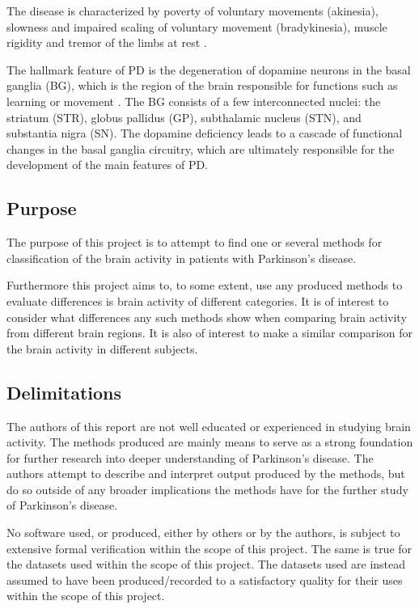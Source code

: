 \documentclass{article}
\begin{document}
The disease is characterized by poverty of voluntary movements (akinesia), slowness and impaired scaling of voluntary movement (bradykinesia), muscle rigidity and tremor of the limbs at rest \citep{DeMaags}.

The hallmark feature of PD is the degeneration of dopamine neurons in the basal ganglia (BG), which is the region of the brain responsible for functions such as learning or movement \citep{Hammond}. 
The BG consists of a few interconnected nuclei: the striatum (STR), globus pallidus (GP), subthalamic nucleus (STN), and substantia nigra (SN). 
The dopamine deficiency leads to a cascade of functional changes in the basal ganglia circuitry, which are ultimately responsible for the development of the main features of PD.

\subsection{Purpose}

The purpose of this project is to attempt to find one or several methods for classification of the brain activity in patients with Parkinson's disease.

Furthermore this project aims to, to some extent, use any produced methods to evaluate differences is brain activity of different categories.
It is of interest to consider what differences any such methods show when comparing brain activity from different brain regions.
It is also of interest to make a similar comparison for the brain activity in different subjects.

\subsection{Delimitations}

The authors of this report are not well educated or experienced in studying brain activity.
The methods produced are mainly means to serve as a strong foundation for further research into deeper understanding of Parkinson's disease.
The authors attempt to describe and interpret output produced by the methods, but do so outside of any broader implications the methods have for the further study of Parkinson's disease.

No software used, or produced, either by others or by the authors, is subject to extensive formal verification within the scope of this project. 
The same is true for the datasets used within the scope of this project.
The datasets used are instead assumed to have been produced/recorded to a satisfactory quality for their uses within the scope of this project.
\end{document}
